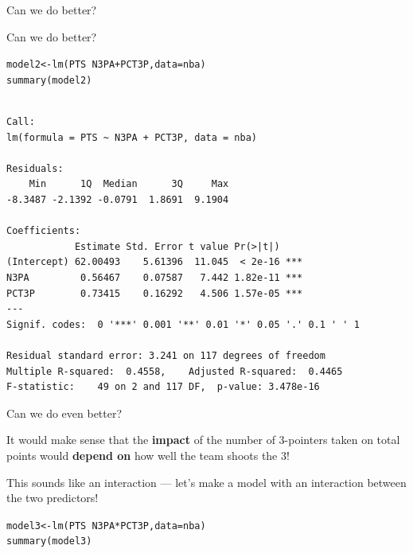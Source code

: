 \documentclass{beamer}\usepackage[]{graphicx}\usepackage[]{color}
\makeatletter
\newcommand{\hlopt}[1]{\textcolor[rgb]{1,0.894,0.769}{#1}}%
\newcommand{\hlstd}[1]{\textcolor[rgb]{1,0.894,0.769}{#1}}%
\newcommand{\hlkwb}[1]{\textcolor[rgb]{0.804,0.776,0.451}{#1}}%
\newcommand{\hlkwc}[1]{\textcolor[rgb]{0.78,0.941,0.545}{#1}}%
\newcommand{\hlkwd}[1]{\textcolor[rgb]{1,0.78,0.769}{#1}}%
\newenvironment{kframe}{%
 \def\at@end@of@kframe{}%
 \ifinner\ifhmode%
  \def\at@end@of@kframe{\end{minipage}}%
  \begin{minipage}{\columnwidth}%
 \fi\fi%
 \def\FrameCommand##1{\hskip\@totalleftmargin \hskip-\fboxsep
 \colorbox{shadecolor}{##1}\hskip-\fboxsep
     \hskip-\linewidth \hskip-\@totalleftmargin \hskip\columnwidth}%
 \MakeFramed {\advance\hsize-\width
   \@totalleftmargin\z@ \linewidth\hsize
   \@setminipage}}%
 {\par\unskip\endMakeFramed%
 \at@end@of@kframe}
\newenvironment{knitrout}{}{} %
\makeatother
\begin{document}
\begin{darkframes}
\begin{frame}{Can we do better?}
    \end{frame}

    \begin{frame}[fragile]{Can we do better?}
      \fontsize{8}{8}\selectfont
\begin{knitrout}
\begin{kframe}
\begin{alltt}
\hlstd{model2} \hlkwb{<-} \hlkwd{lm}\hlstd{(PTS} \hlopt{~} \hlstd{N3PA} \hlopt{+} \hlstd{PCT3P,} \hlkwc{data}\hlstd{=nba)}
\hlkwd{summary}\hlstd{(model2)}
\end{alltt}
\begin{verbatim}

Call:
lm(formula = PTS ~ N3PA + PCT3P, data = nba)

Residuals:
    Min      1Q  Median      3Q     Max 
-8.3487 -2.1392 -0.0791  1.8691  9.1904 

Coefficients:
            Estimate Std. Error t value Pr(>|t|)    
(Intercept) 62.00493    5.61396  11.045  < 2e-16 ***
N3PA         0.56467    0.07587   7.442 1.82e-11 ***
PCT3P        0.73415    0.16292   4.506 1.57e-05 ***
---
Signif. codes:  0 '***' 0.001 '**' 0.01 '*' 0.05 '.' 0.1 ' ' 1

Residual standard error: 3.241 on 117 degrees of freedom
Multiple R-squared:  0.4558,	Adjusted R-squared:  0.4465 
F-statistic:    49 on 2 and 117 DF,  p-value: 3.478e-16
\end{verbatim}
\end{kframe}
\end{knitrout}

    \end{frame}

    \begin{frame}{Can we do even better?}
      \begin{center}
        It would make sense that the \textbf{impact} of the number of 3-pointers taken on total points would \textbf{depend on} how well the team shoots the 3!

        \pause\bigskip

        This sounds like an interaction --- let's make a model with an interaction between the two predictors!
      \end{center}
    \end{frame}

    \begin{frame}[fragile]
      \fontsize{8}{8}\selectfont
\begin{knitrout}
\begin{kframe}
\begin{alltt}
\hlstd{model3} \hlkwb{<-} \hlkwd{lm}\hlstd{(PTS} \hlopt{~} \hlstd{N3PA} \hlopt{*} \hlstd{PCT3P,} \hlkwc{data}\hlstd{=nba)}
\hlkwd{summary}\hlstd{(model3)}
\end{alltt}
\begin{verbatim}


\end{verbatim}
\end{kframe}
\end{knitrout}
\end{frame}
\end{darkframes}
\end{document}
